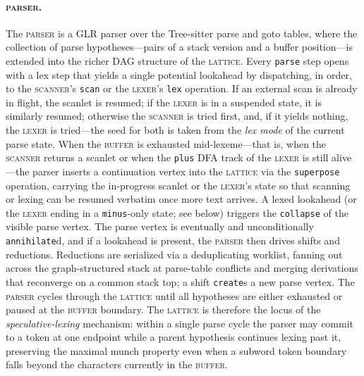 \documentclass[11pt]{article}
\theoremstyle{plain}
\theoremstyle{definition}
\begin{document}
\paragraph{\textsc{parser}.} The \textsc{parser} is a GLR parser over the
Tree-sitter parse and goto tables, where the collection of parse
hypotheses---pairs of a stack version and a buffer position---is extended into
the richer DAG structure of the \textsc{lattice}. Every \texttt{parse} step
opens with a lex step that yields a single potential lookahead by dispatching,
in order, to the \textsc{scanner}'s \texttt{scan} or the \textsc{lexer}'s
\texttt{lex} operation. If an external scan is already in flight, the scanlet is
resumed; if the \textsc{lexer} is in a suspended state, it is similarly resumed;
otherwise the \textsc{scanner} is tried first, and, if it yields nothing, the
\textsc{lexer} is tried---the seed for both is taken from the \emph{lex mode} of
the current parse state. When the \textsc{buffer} is exhausted mid-lexeme---that
is, when the \textsc{scanner} returns a scanlet or when the \texttt{plus} DFA
track of the \textsc{lexer} is still alive---the parser inserts a continuation
vertex into the \textsc{lattice} via the \texttt{superpose} operation, carrying
the in-progress scanlet or the \textsc{lexer}'s state so that scanning or lexing
can be resumed verbatim once more text arrives. A lexed lookahead (or the
\textsc{lexer} ending in a \texttt{minus}-only state; see below) triggers the
\texttt{collapse} of the visible parse vertex. The parse vertex is eventually
and unconditionally \texttt{annihilate}d, and if a lookahead is present, the
\textsc{parser} then drives shifts and reductions. Reductions are serialized via
a deduplicating worklist, fanning out across the graph-structured stack at
parse-table conflicts and merging derivations that reconverge on a common stack
top; a shift \texttt{create}s a new parse vertex. The \textsc{parser} cycles
through the \textsc{lattice} until all hypotheses are either exhausted or paused
at the \textsc{buffer} boundary. The \textsc{lattice} is therefore the locus of
the \emph{speculative-lexing} mechanism: within a single parse cycle the parser
may commit to a token at one endpoint while a parent hypothesis continues lexing
past it, preserving the maximal munch property even when a subword token
boundary falls beyond the characters currently in the \textsc{buffer}.
\end{document}
